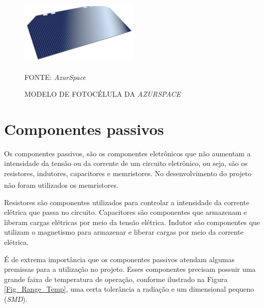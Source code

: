 \documentclass[
	12pt,				%
	openright,			%
	oneside,			%
	a4paper,			%
	english,			%
	french,				%
	spanish,			%
	brazil,				%
	oldfontcommands
	]{abntex2}
\begin{document}
	\begin{figure}[th]
		\caption{MODELO DE FOTOCÉLULA DA \textit{AZURSPACE}}
		\label{Fig_Cell_Azur}
		\centering
		\includegraphics[width=0.5\linewidth]{./figs/ZTJ}
			
		\begin{small}
			FONTE: \textit{AzurSpace}\textsuperscript{\cite{AzurSpace2}}
		\end{small}		
	\end{figure}

\section[Componentes passivos]{Componentes passivos}\label{Cap_Passivo}

	Os componentes passivos, são os componentes eletrônicos que não aumentam a intensidade da tensão ou da corrente de um circuito eletrônico, ou seja, são os resistores, indutores, capacitores e memristores. No desenvolvimento do projeto não foram utilizados os memristores.\textsuperscript{\cite{Passivo}}
	
	Resistores são componentes utilizados para controlar a intensidade da corrente elétrica que passa no circuito. Capacitores são componentes que armazenam e liberam cargas elétricas por meio da tensão elétrica. Indutor são componentes que utilizam o magnetismo para armazenar e liberar cargas por meio da corrente elétrica.

	É de extrema importância que os componentes passivos atendam algumas premissas para a utilização no projeto. Esses componentes precisam possuir uma grande faixa de temperatura de operação, conforme ilustrado na Figura \ref{Fig_Range_Temp}, uma certa tolerância a radiação e um dimensional pequeno (\textit{SMD}).
	
\end{document}
